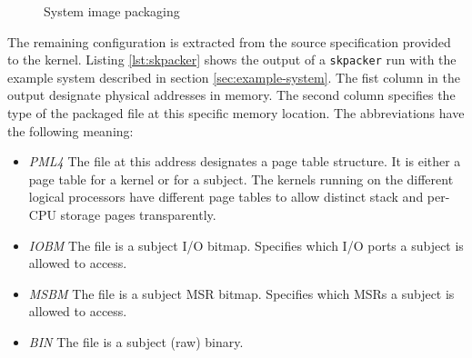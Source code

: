 \begin{figure}[h]
	\centering
	\caption{System image packaging}
	\label{fig:image-packaging}
\end{figure}

The remaining configuration is extracted from the source specification provided
to the kernel. Listing \ref{lst:skpacker} shows the output of a
\texttt{skpacker} run with the example system described in section
\ref{sec:example-system}. The fist column in the output designate physical
addresses in memory. The second column specifies the type of the packaged file
at this specific memory location. The abbreviations have the following meaning:

\begin{itemize}
	\item \emph{PML4} The file at this address designates a page table
		structure. It is either a page table for a kernel or for a subject. The
		kernels running on the different logical processors have different page
		tables to allow distinct stack and per-CPU storage pages transparently.
	\item \emph{IOBM} The file is a subject I/O bitmap. Specifies which I/O
		ports a subject is allowed to access.
	\item \emph{MSBM} The file is a subject MSR bitmap. Specifies which MSRs a
		subject is allowed to access.
	\item \emph{BIN} The file is a subject (raw) binary.
\end{itemize}

